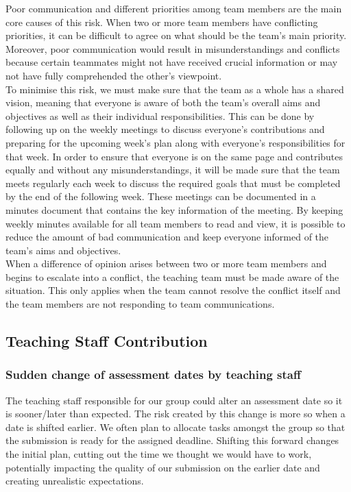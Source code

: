 Poor communication and different priorities among team members are the main core causes of this risk. When two or more team members have conflicting priorities, it can be difficult to agree on what should be the team's main priority. Moreover, poor communication would result in misunderstandings and conflicts because certain teammates might not have received crucial information or may not have fully comprehended the other’s viewpoint.
\\

To minimise this risk, we must make sure that the team as a whole has a shared vision, meaning that everyone is aware of both the team's overall aims and objectives as well as their individual responsibilities. This can be done by following up on the weekly meetings to discuss everyone's contributions and preparing for the upcoming week's plan along with everyone's responsibilities for that week. In order to ensure that everyone is on the same page and contributes equally and without any misunderstandings, it will be made sure that the team meets regularly each week to discuss the required goals that must be completed by the end of the following week. These meetings can be documented in a minutes document that contains the key information of the meeting. By keeping weekly minutes available for all team members to read and view, it is possible to reduce the amount of bad communication and keep everyone informed of the team's aims and objectives.
\\

When a difference of opinion arises between two or more team members and begins to escalate into a conflict, the teaching team must be made aware of the situation. This only applies when the team cannot resolve the conflict itself and the team members are not responding to team communications.


\subsection{Teaching Staff Contribution}

\subsubsection{Sudden change of assessment dates by teaching staff}

The teaching staff responsible for our group could alter an assessment date so it is sooner/later than expected. The risk created by this change is more so when a date is shifted earlier. We often plan to allocate tasks amongst the group so that the submission is ready for the assigned deadline. Shifting this forward changes the initial plan, cutting out the time we thought we would have to work, potentially impacting the quality of our submission on the earlier date and creating unrealistic expectations.
\\

